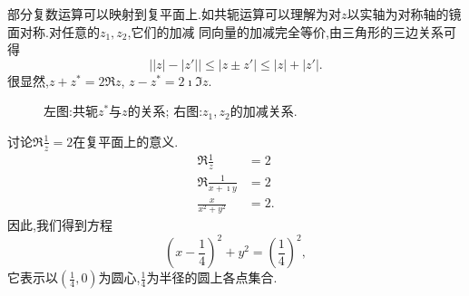 部分复数运算可以映射到复平面上.如共轭运算可以理解为对$z$以实轴为对称轴的镜面对称.对任意的$z_1,z_2$,它们的加减
同向量的加减完全等价,由三角形的三边关系可得
\begin{equation}
    \left| |z|- |z'| \right| \leq |z \pm z'| \leq |z| + |z'| .
\end{equation}
很显然,$z+z^{*} = 2 \Re z$, $z-z^{*} = 2\imath \Im z$.
\begin{figure}
    \centering
    
\quad 
        
        \caption{左图:共轭$z^{*}$与$z$的关系; 右图:$z_1, z_2$的加减关系.}
    \end{figure}
\begin{examplebox}{讨论$\Re \frac{1}{z} = 2$在复平面上的意义.}
    \begin{align*}
        \Re \frac{1}{z} &= 2\\
        \Re \frac{1}{x+\imath y} &  = 2 \\
        \frac{x}{x^2 +y^2} & = 2 .
    \end{align*}
因此,我们得到方程
\begin{equation*}
    (x-\frac{1}{4})^2 + y^2 = \left( \frac{1}{4}\right)^2,
\end{equation*}
它表示以$(\frac{1}{4},0)$为圆心,$\frac{1}{4}$为半径的圆上各点集合.
\end{examplebox}
        


